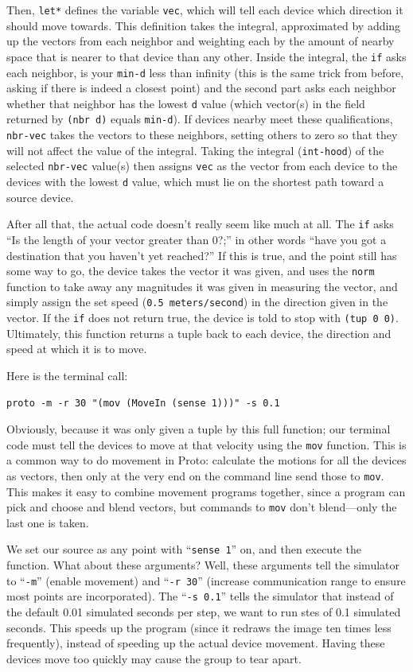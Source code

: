 \documentclass{article}
\newcommand\code[1]{\begin{center}\var{#1}\end{center}}
\newcommand\var[1]{{\tt #1}}
\newcommand\qvar[1]{``{\tt #1}''}
\begin{document}
Then, \var{let*} defines the variable \var{vec}, which will tell each
device which direction it should move towards.  This definition takes
the integral, approximated by adding up the vectors from each neighbor
and weighting each by the amount of nearby space that is nearer to
that device than any other.  Inside the integral, the \var{if} asks
each neighbor, is your \var{min-d} less than infinity (this is the
same trick from before, asking if there is indeed a closest point) and
the second part asks each neighbor whether that neighbor has the
lowest \var{d} value (which vector(s) in the field returned by
\var{(nbr d)} equals \var{min-d}).  If devices nearby meet these
qualifications, \var{nbr-vec} takes the vectors to these neighbors,
setting others to zero so that they will not affect the value of the
integral.  Taking the integral (\var{int-hood}) of the selected
\var{nbr-vec} value(s) then assigns \var{vec} as the vector from each
device to the devices with the lowest \var{d} value, which must lie on
the shortest path toward a source device.

After all that, the actual code doesn't really seem like much at all.
The \var{if} asks ``Is the length of your vector greater than 0?;'' in
other words ``have you got a destination that you haven't yet
reached?''  If this is true, and the point still has some way to go,
the device takes the vector it was given, and uses the \var{norm}
function to take away any magnitudes it was given in measuring the
vector, and simply assign the set speed (\var{0.5 meters/second}) in
the direction given in the vector.  If the \var{if} does not return
true, the device is told to stop with \var{(tup 0 0)}.  Ultimately,
this function returns a tuple back to each device, the direction and
speed at which it is to move.

Here is the terminal call:

\code{proto -m -r 30 "(mov (MoveIn (sense 1)))" -s 0.1}

Obviously, because it was only given a tuple by this full function;
our terminal code must tell the devices to move at that velocity using
the \var{mov} function.  This is a common way to do movement in Proto:
calculate the motions for all the devices as vectors, then only at the
very end on the command line send those to \var{mov}.  This makes it
easy to combine movement programs together, since a program can pick
and choose and blend vectors, but commands to \var{mov} don't
blend---only the last one is taken.

We set our source as any point with \qvar{sense 1} on, and then
execute the function.  What about these arguments?  Well, these
arguments tell the simulator to \qvar{-m} (enable movement) and
\qvar{-r 30} (increase communication range to ensure most points are
incorporated).  The \qvar{-s 0.1} tells the simulator that instead of
the default 0.01 simulated seconds per step, we want to run stes of
0.1 simulated seconds.  This speeds up the program (since it redraws
the image ten times less frequently), instead of speeding up the
actual device movement.  Having these devices move too quickly may
cause the group to tear apart. 
\end{document}
